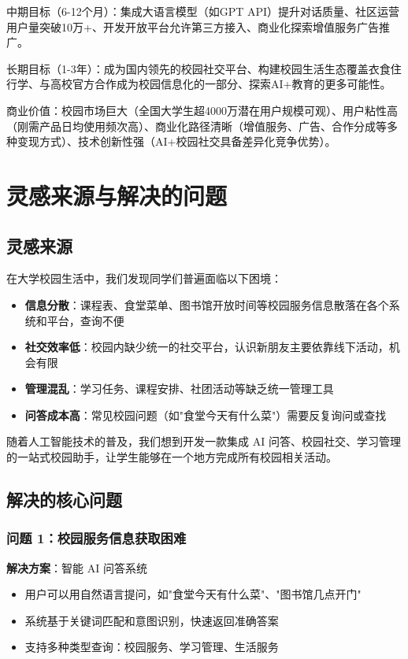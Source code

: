 \documentclass[12pt,a4paper]{article}
\begin{document}
中期目标（6-12个月）：集成大语言模型（如GPT API）提升对话质量、社区运营用户量突破10万+、开发开放平台允许第三方接入、商业化探索增值服务广告推广。

长期目标（1-3年）：成为国内领先的校园社交平台、构建校园生活生态覆盖衣食住行学、与高校官方合作成为校园信息化的一部分、探索AI+教育的更多可能性。

商业价值：校园市场巨大（全国大学生超4000万潜在用户规模可观）、用户粘性高（刚需产品日均使用频次高）、商业化路径清晰（增值服务、广告、合作分成等多种变现方式）、技术创新性强（AI+校园社交具备差异化竞争优势）。

\section{灵感来源与解决的问题}

\subsection{灵感来源}

在大学校园生活中，我们发现同学们普遍面临以下困境：

\begin{itemize}
    \item \textbf{信息分散}：课程表、食堂菜单、图书馆开放时间等校园服务信息散落在各个系统和平台，查询不便
    \item \textbf{社交效率低}：校园内缺少统一的社交平台，认识新朋友主要依靠线下活动，机会有限
    \item \textbf{管理混乱}：学习任务、课程安排、社团活动等缺乏统一管理工具
    \item \textbf{问答成本高}：常见校园问题（如"食堂今天有什么菜"）需要反复询问或查找
\end{itemize}

随着人工智能技术的普及，我们想到开发一款集成 AI 问答、校园社交、学习管理的一站式校园助手，让学生能够在一个地方完成所有校园相关活动。

\subsection{解决的核心问题}

\subsubsection{问题 1：校园服务信息获取困难}

\textbf{解决方案}：智能 AI 问答系统
\begin{itemize}
    \item 用户可以用自然语言提问，如"食堂今天有什么菜"、"图书馆几点开门"
    \item 系统基于关键词匹配和意图识别，快速返回准确答案
    \item 支持多种类型查询：校园服务、学习管理、生活服务
\end{itemize}
\end{document}
